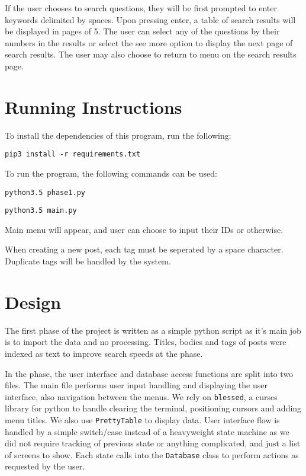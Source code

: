 \documentclass{article}
\begin{document}
If the user chooses to search questions, they will be first prompted to enter keywords delimited by spaces. Upon pressing enter, a table of search results will be displayed in pages of 5. The user can select any of the questions by their numbers in the results or select the see more option to display the next page of search results. The user may also choose to return to menu on the search results page.

\section{Running Instructions}

To install the dependencies of this program, run the following:

\verb|pip3 install -r requirements.txt|

To run the program, the following commands can be used:

\verb|python3.5 phase1.py|

\verb|python3.5 main.py|


Main menu will appear, and user can choose to input their IDs or otherwise.

When creating a new post, each tag must be seperated by a space character. Duplicate tags will be handled by the system.

\section{Design}

The first phase of the project is written as a simple python script as it's main job is to import the data and no processing. Titles, bodies and tags of posts were indexed as text to improve search speeds at the  phase.

In the  phase, the user interface and database access functions are split into two files. The main file performs user input handling and displaying the user interface, also navigation between the menus. We rely on \verb|blessed|, a curses library for python to handle clearing the terminal, positioning cursors and adding menu titles. We also use \verb|PrettyTable| to display data. User interface flow is handled by a simple switch/case instead of a heavyweight state machine as we did not require tracking of previous state or anything complicated, and just a list of screens to show. Each state calls into the \verb|Database| class to perform actions as requested by the user.
\end{document}
